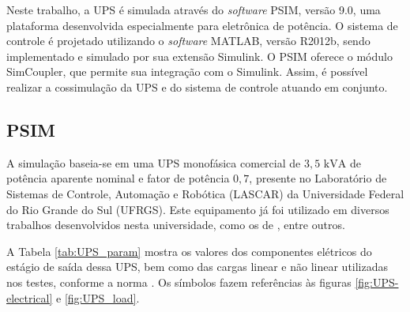 \documentclass[repeatfields,oneside,overleaf]{tcc}
\begin{document}
Neste trabalho, a UPS é simulada através do \textit{software} PSIM, versão 9.0, uma plataforma desenvolvida especialmente para eletrônica de potência.
O sistema de controle é projetado utilizando o \textit{software} MATLAB, versão R2012b, sendo implementado e simulado por sua extensão Simulink.
O PSIM oferece o módulo SimCoupler, que permite sua integração com o Simulink.
Assim, é possível realizar a cossimulação da UPS e do sistema de controle atuando em conjunto.



\subsection{PSIM}

A simulação baseia-se em uma UPS monofásica comercial de $3,5 \text{ kVA}$ de potência aparente nominal e fator de potência $0,7$, presente no Laboratório de Sistemas de Controle, Automação e Robótica (LASCAR) da Universidade Federal do Rio Grande do Sul (UFRGS).
Este equipamento já foi utilizado em diversos trabalhos desenvolvidos nesta universidade, como os de \textcite{Pereira2014, Schildt2014, Corleta2015, Lorenzini2015, Lorenzini2019, Corleta2016, Keiel2017, Keiel2019, Bertoldi2019, Bruna2020}, entre outros.

A Tabela \ref{tab:UPS_param} mostra os valores dos componentes elétricos do estágio de saída dessa UPS, bem como das cargas linear e não linear utilizadas nos testes, conforme a norma \textcite{IEC62040-3:2011}.
Os símbolos fazem referências às figuras \ref{fig:UPS-electrical} e \ref{fig:UPS_load}.
\end{document}

